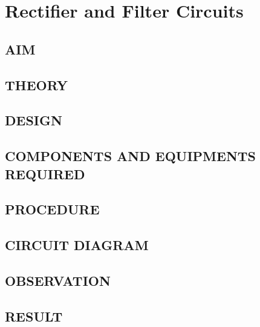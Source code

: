 \chapter[Rectifier and Filter Circuits]{Rectifier and Filter Circuits}

\section*{AIM}
\section*{THEORY}
\section*{DESIGN}
\section*{COMPONENTS AND EQUIPMENTS REQUIRED}
\section*{PROCEDURE}
\section*{CIRCUIT DIAGRAM}
\section*{OBSERVATION}
\section*{RESULT}

